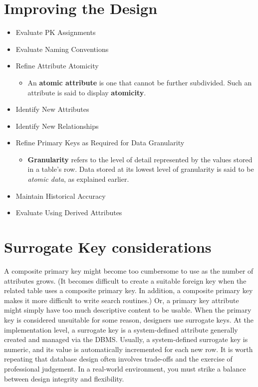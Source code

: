 \documentclass[a4paper, 12pt, titlepage]{report}
\begin{document}
{\section{Improving the Design}
\begin{itemize}
\item Evaluate PK Assignments
\item Evaluate Naming Conventions
\item Refine Attribute Atomicity
\begin{itemize}
\item An \textbf{atomic attribute} is one that cannot be further subdivided. Such an attribute is said to display \textbf{atomicity}.
\end{itemize}
\item Identify New Attributes
\item Identify New Relationships
\item Refine Primary Keys as Required for Data Granularity
\begin{itemize}
\item \textbf{Granularity} refers to the level of detail represented by the values stored in a table’s row. Data stored at its lowest level of granularity is said to be \emph{atomic data}, as explained earlier. 
\end{itemize}
\item Maintain Historical Accuracy
\item Evaluate Using Derived Attributes
\end{itemize}
\section{Surrogate Key considerations}
A composite primary key might become too cumbersome to use as the number of attributes grows. (It becomes difficult to create a suitable foreign key when the related table uses a composite primary key. In
addition, a composite primary key makes it more difficult to write search routines.) Or, a primary key attribute might simply have too much descriptive content to be usable. When the primary key is considered unsuitable for some reason, designers use surrogate keys. At the implementation level, a surrogate key is a system-defined attribute generally created and managed via the DBMS. Usually, a system-defined surrogate key is numeric,
and its value is automatically incremented for each new row.
It is worth repeating that database design often involves trade-offs and the exercise of professional judgement. In a real-world environment, you must strike a balance between design integrity and flexibility.
}
\end{document}

